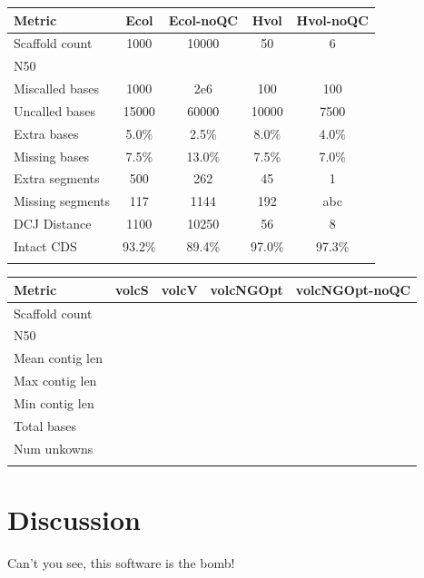 \documentclass{bioinfo}
\begin{document}
\begin{table}[!t]
{\begin{tabular}{l|cccc}\toprule
Metric & Ecol & Ecol-noQC & Hvol & Hvol-noQC\\\midrule
Scaffold count & 1000 & 10000 & 50  & 6 \\
N50 & & & & \\
Miscalled bases & 1000 & 2e6 & 100 & 100 \\
Uncalled bases & 15000 & 60000 & 10000 & 7500 \\
Extra bases & 5.0\% & 2.5\% & 8.0\% & 4.0\% \\
Missing bases & 7.5\% & 13.0\% & 7.5\% & 7.0\% \\
Extra segments & 500 & 262 & 45 & 1 \\
Missing segments & 117 & 1144 & 192 & abc \\
DCJ Distance & 1100 & 10250 & 56 & 8 \\
Intact CDS & 93.2\% & 89.4\% & 97.0\% & 97.3\% \\
\botrule \\
\end{tabular}}{}
\end{table}


\begin{table}[!t]
{\begin{tabular}{l|cccc}\toprule
Metric           &  volcS & volcV & volcNGOpt & volcNGOpt-noQC\\\midrule
Scaffold count   & & & & \\
N50              & & & & \\
Mean contig len  & & & & \\
Max contig len   & & & & \\
Min contig len   & & & & \\
Total bases      & & & & \\
Num unkowns      & & & & \\
\botrule \\
\end{tabular}}{}
\end{table}

\section{Discussion}

Can't you see, this software is the bomb!
\end{document}
